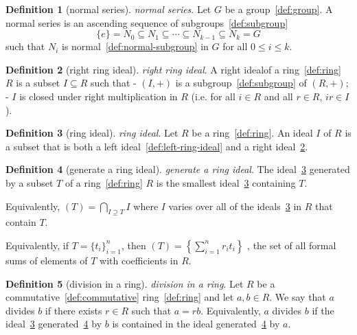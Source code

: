 \documentclass[12pt,a4paper]{article}
\theoremstyle{definition}
\newtheorem{definition}{Definition}
\begin{document}
\begin{definition}[normal series]\label{def:normal-series}
\emph{normal series}. Let $G$ be a group~\ref{def:group}. A normal series is an ascending sequence of subgroups~\ref{def:subgroup} $$\{e\} = N_0\subseteq N_1\subseteq \cdots\subseteq N_{k-1} \subseteq N_k = G$$ such that $N_i$ is normal~\ref{def:normal-subgroup} in $G$ for all $0\leq i\leq k$.
\end{definition}

\begin{definition}[right ring ideal]\label{def:right-ring-ideal}
\emph{right ring ideal}. A right idealof a ring~\ref{def:ring} $R$ is a subset $I\subseteq R$ such that 
- $(I,+)$ is a subgroup~\ref{def:subgroup} of $(R,+)$;
- $I$ is closed under right multiplication in $R$ (i.e. for all $i\in R$ and all $r\in R$, $ir \in I$).
\end{definition}

\begin{definition}[ring ideal]\label{def:ring-ideal}
\emph{ring ideal}. Let $R$ be a ring~\ref{def:ring}.  An ideal $I$ of $R$ is a subset that is both a left ideal~\ref{def:left-ring-ideal} and a right ideal~\ref{def:right-ring-ideal}.
\end{definition}

\begin{definition}[generate a ring ideal]\label{def:generate-a-ring-ideal}
\emph{generate a ring ideal}. The ideal~\ref{def:ring-ideal} generated by a subset $T$ of a ring~\ref{def:ring} $R$ is the smallest ideal~\ref{def:ring-ideal} containing $T$. 

Equivalently, $(T) = \bigcap\limits_{I\supseteq T} I$ where $I$ varies over all of the ideals~\ref{def:ring-ideal} in 
$R$ that contain $T$. 

Equivalently, if $T = \{t_i\}_{i=1}^n$, then $(T) = \left\{\sum\limits_{i=1}^n r_it_i\right\}$ , the set of all formal sums of elements of $T$ with coefficients in $R$.
\end{definition}

\begin{definition}[division in a ring]\label{def:division-in-a-ring}
\emph{division in a ring}. Let $R$ be a commutative~\ref{def:commutative} ring~\ref{def:ring} and let $a,b \in R$. We say that $a$ divides $b$ if there exists $r\in R$ such that $a = rb$. Equivalently, $a$ divides $b$ if the ideal~\ref{def:ring-ideal} generated~\ref{def:generate-a-ring-ideal} by $b$ is contained in the ideal generated~\ref{def:generate-a-ring-ideal} by $a$.
\end{definition}
\end{document}
